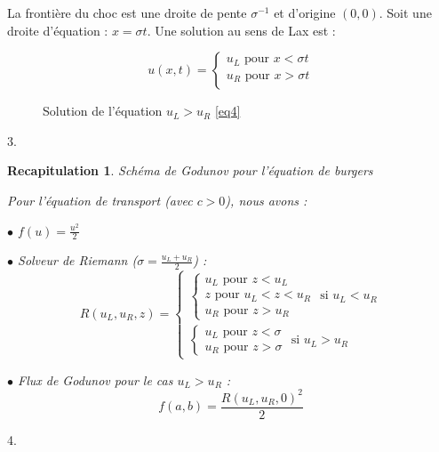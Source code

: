 \documentclass{article}
\newtheorem{recap}{Recapitulation}
\begin{document}
La frontière du choc est une droite de pente $\sigma^{-1}$ et d'origine $(0,0)$. Soit une droite d'équation : $x = \sigma t$. Une solution au sens de Lax est :

\[ u(x,t) = \left\{ \begin{matrix}
				u_L \text{ pour } x < \sigma t \\
				u_R \text{ pour } x > \sigma t \\
\end{matrix}\right.
\tag{Sol4.2} \]

\begin{figure}
  
  \caption{Solution de l'équation $u_L > u_R$ \ref{eq4}}
\end{figure}

3.

\begin{recap}{Schéma de Godunov pour l'équation de burgers}

Pour l'équation de transport (avec $c>0$), nous avons :

$\bullet$ $f(u) = \frac{u^2}{2}$

$\bullet$ Solveur de Riemann ($\sigma = \frac{u_L+u_R}{2}$) :
\[ R(u_L, u_R, z) = \left\{ \begin{matrix}

	\left\{ \begin{matrix}
		u_L \text{ pour } z < u_L \\
		z \text{ pour } u_L < z < u_R \\
		u_R \text{ pour } z > u_R	
	\end{matrix} \right. \text{ si } u_L < u_R \\	
	
	\left\{ \begin{matrix} 
		u_L \text{ pour } z < \sigma \\
		u_R \text{ pour } z > \sigma
	\end{matrix} \right. \text{ si } u_L > u_R

	\end{matrix} \right. \]

$\bullet$ Flux de Godunov pour le cas $u_L > u_R$ :
\[ f(a,b) = \frac{R(u_L,u_R,0)^2}{2}\]

\end{recap}

4.
\end{document}
